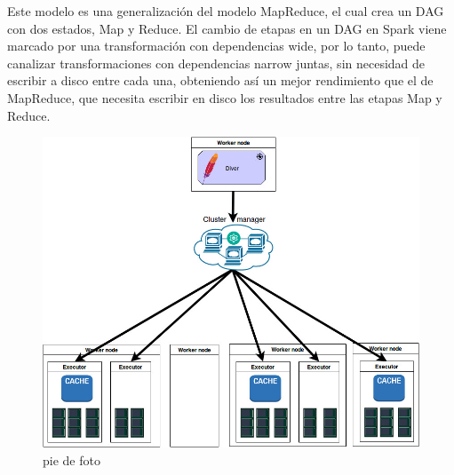 Este modelo es una generalización del modelo MapReduce, el cual crea un DAG con dos estados, Map y Reduce. El cambio de etapas en un DAG en Spark viene marcado por una transformación con dependencias wide, por lo tanto, puede canalizar transformaciones con dependencias narrow juntas, sin necesidad de escribir a disco entre cada una, obteniendo así un mejor rendimiento que el de MapReduce, que necesita escribir en disco los resultados entre las etapas Map y Reduce.\\

\begin{figure}[t]
        \includegraphics[width=0.9\hsize]{img/arquitectura}
        \centering
        \caption{pie de foto}
        \label{foto}
\end{figure}
